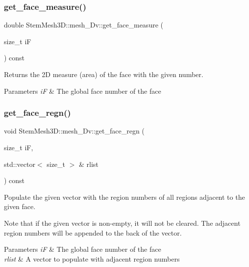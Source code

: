 \subsubsection{\texorpdfstring{get\+\_\+face\+\_\+measure()}{get\_face\_measure()}}
{\footnotesize\ttfamily double Stem\+Mesh3\+D\+::mesh\+\_\+Dv\+::get\+\_\+face\+\_\+measure (\begin{DoxyParamCaption}\item[{size\+\_\+t}]{iF }\end{DoxyParamCaption}) const}



Returns the 2D measure (area) of the face with the given number. 


\begin{DoxyParams}{Parameters}
{\em iF} & The global face number of the face \\
\hline
\end{DoxyParams}
\mbox{\label{classStemMesh3D_1_1mesh__3Dv_a77ba74ed0585df27c1d16b26d2a4caa0}} 
\subsubsection{\texorpdfstring{get\+\_\+face\+\_\+regn()}{get\_face\_regn()}}
{\footnotesize\ttfamily void Stem\+Mesh3\+D\+::mesh\+\_\+Dv\+::get\+\_\+face\+\_\+regn (\begin{DoxyParamCaption}\item[{size\+\_\+t}]{iF,  }\item[{std\+::vector$<$ size\+\_\+t $>$ \&}]{rlist }\end{DoxyParamCaption}) const}



Populate the given vector with the region numbers of all regions adjacent to the given face. 

Note that if the given vector is non-\/empty, it will not be cleared. The adjacent region numbers will be appended to the back of the vector. 
\begin{DoxyParams}{Parameters}
{\em iF} & The global face number of the face \\
\hline
{\em rlist} & A vector to populate with adjacent region numbers \\
\hline
\end{DoxyParams}
\mbox{\label{classStemMesh3D_1_1mesh__3Dv_a4a48a14ef16c33c441fff9dafd26989b}} 
